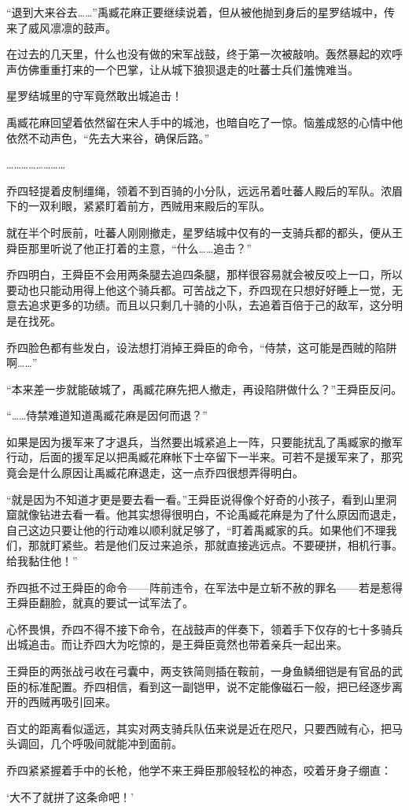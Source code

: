 “退到大来谷去……”禹臧花麻正要继续说着，但从被他抛到身后的星罗结城中，传来了威风凛凛的鼓声。

在过去的几天里，什么也没有做的宋军战鼓，终于第一次被敲响。轰然暴起的欢呼声仿佛重重打来的一个巴掌，让从城下狼狈退走的吐蕃士兵们羞愧难当。

星罗结城里的守军竟然敢出城追击！

禹臧花麻回望着依然留在宋人手中的城池，也暗自吃了一惊。恼羞成怒的心情中他依然不动声色，“先去大来谷，确保后路。”

……………………

乔四轻提着皮制缰绳，领着不到百骑的小分队，远远吊着吐蕃人殿后的军队。浓眉下的一双利眼，紧紧盯着前方，西贼用来殿后的军队。

就在半个时辰前，吐蕃人刚刚撤走，星罗结城中仅有的一支骑兵都的都头，便从王舜臣那里听说了他正打着的主意，“什么……追击？”

乔四明白，王舜臣不会用两条腿去追四条腿，那样很容易就会被反咬上一口，所以要动也只能动用得上他这个骑兵都。可苦战之下，乔四现在只想好好睡上一觉，无意去追求更多的功绩。而且以只剩几十骑的小队，去追着百倍于己的敌军，这分明是在找死。

乔四脸色都有些发白，设法想打消掉王舜臣的命令，“侍禁，这可能是西贼的陷阱啊……”

“本来差一步就能破城了，禹臧花麻先把人撤走，再设陷阱做什么？”王舜臣反问。

“……侍禁难道知道禹臧花麻是因何而退？”

如果是因为援军来了才退兵，当然要出城紧追上一阵，只要能扰乱了禹臧家的撤军行动，后面的援军足以把禹臧花麻帐下士卒留下一半来。可若不是援军来了，那究竟会是什么原因让禹臧花麻退走，这一点乔四很想弄得明白。

“就是因为不知道才更是要去看一看。”王舜臣说得像个好奇的小孩子，看到山里洞窟就像钻进去看一看。他其实想得很明白，不论禹臧花麻是为了什么原因而退走，自己这边只要让他的行动难以顺利就足够了，“盯着禹臧家的兵。如果他们不理我们，那就盯紧些。若是他们反过来追杀，那就直接逃远点。不要硬拼，相机行事。给我黏住他！”

乔四抵不过王舜臣的命令——阵前违令，在军法中是立斩不赦的罪名——若是惹得王舜臣翻脸，就真的要试一试军法了。

心怀畏惧，乔四不得不接下命令，在战鼓声的伴奏下，领着手下仅存的七十多骑兵出城追击。而让乔四大为吃惊的，是王舜臣竟然也带着亲兵一起出来。

王舜臣的两张战弓收在弓囊中，两支铁简则插在鞍前，一身鱼鳞细铠是有官品的武臣的标准配置。乔四相信，看到这一副铠甲，说不定能像磁石一般，把已经逐步离开的西贼再吸引回来。

百丈的距离看似遥远，其实对两支骑兵队伍来说是近在咫尺，只要西贼有心，把马头调回，几个呼吸间就能冲到面前。

乔四紧紧握着手中的长枪，他学不来王舜臣那般轻松的神态，咬着牙身子绷直：

‘大不了就拼了这条命吧！’

